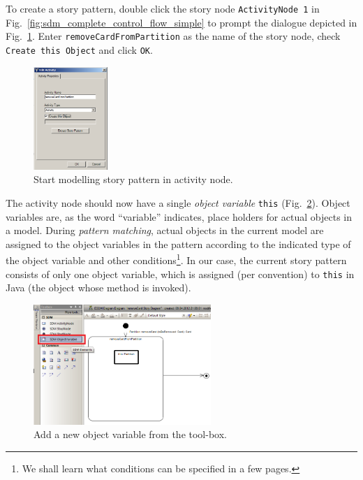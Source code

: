 To create a story pattern, double click the story node \texttt{ActivityNode 1}
in Fig.~\ref{fig:sdm_complete_control_flow_simple} to prompt the dialogue
depicted in Fig.~\ref{fig:story_pattern}.  Enter
\texttt{remove\-Card\-From\-Partition} as the name of the story node, check
\texttt{Create this Object} and click \texttt{OK}.

\begin{figure}[htpb]
\begin{center} 
  \includegraphics[width=0.25\textwidth]{pics/sdmBilder/removeCard/sdm07RAW}
  \caption{Start modelling story pattern in activity node.}  
  \label{fig:story_pattern}
\end{center}
\end{figure}

The activity node should now have a single \emph{object variable} \texttt{this}
(Fig.~\ref{fig:tool_box}). Object variables are, as the word ``variable'' indicates,
place holders for actual objects in a model.  During \emph{pattern matching},
actual objects in the  current model are assigned to the object variables in the
pattern according to  the indicated type of the object variable and other
conditions\footnote{We shall learn what conditions can be specified in a
few pages.}. In our case, the current story pattern consists of only
one object variable, which is assigned (per convention) to \texttt{this} in Java (the
object whose method is invoked).

\begin{figure}[htp]
\begin{center}
  \includegraphics[width=0.6\textwidth]{pics/sdmBilder/removeCard/sdm09RAW}
  \caption{Add a new object variable from the tool-box.}  
  \label{fig:tool_box}
\end{center}
\end{figure}

